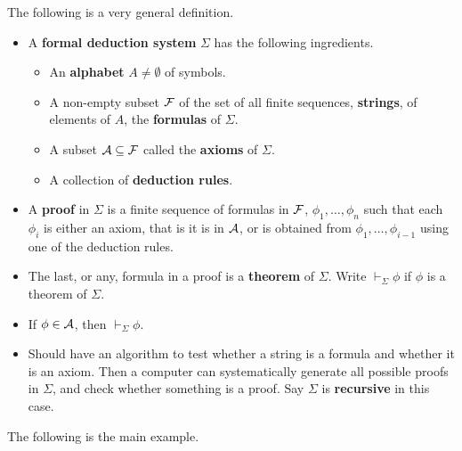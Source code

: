 \begin{definition}
The following is a very general definition.
\begin{itemize}
\item A \textbf{formal deduction system} $ \Sigma $ has the following ingredients.
\begin{itemize}
\item An \textbf{alphabet} $ A \ne \emptyset $ of symbols.
\item A non-empty subset $ \mathcal{F} $ of the set of all finite sequences, \textbf{strings}, of elements of $ A $, the \textbf{formulas} of $ \Sigma $.
\item A subset $ \mathcal{A} \subseteq \mathcal{F} $ called the \textbf{axioms} of $ \Sigma $.
\item A collection of \textbf{deduction rules}.
\end{itemize}
\item A \textbf{proof} in $ \Sigma $ is a finite sequence of formulas in $ \mathcal{F} $, $ \phi_1, \dots, \phi_n $ such that each $ \phi_i $ is either an axiom, that is it is in $ \mathcal{A} $, or is obtained from $ \phi_1, \dots, \phi_{i - 1} $ using one of the deduction rules.
\item The last, or any, formula in a proof is a \textbf{theorem} of $ \Sigma $. Write $ \vdash_\Sigma \phi $ if $ \phi $ is a theorem of $ \Sigma $.
\end{itemize}
\end{definition}

\begin{remark*}
\hfill
\begin{itemize}
\item If $ \phi \in \mathcal{A} $, then $ \vdash_\Sigma \phi $.
\item Should have an algorithm to test whether a string is a formula and whether it is an axiom. Then a computer can systematically generate all possible proofs in $ \Sigma $, and check whether something is a proof. Say $ \Sigma $ is \textbf{recursive} in this case.
\end{itemize}
\end{remark*}

\pagebreak

The following is the main example.

